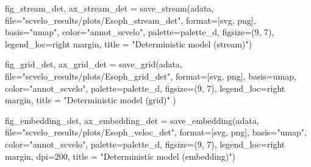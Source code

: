 \documentclass[
  letterpaper,
  DIV=11,
  numbers=noendperiod]{scrreprt}
\newenvironment{Shaded}{\begin{snugshade}}{\end{snugshade}}
\newcommand{\BuiltInTok}[1]{\textcolor[rgb]{0.00,0.23,0.31}{#1}}
\newcommand{\DecValTok}[1]{\textcolor[rgb]{0.68,0.00,0.00}{#1}}
\newcommand{\NormalTok}[1]{\textcolor[rgb]{0.00,0.23,0.31}{#1}}
\newcommand{\OperatorTok}[1]{\textcolor[rgb]{0.37,0.37,0.37}{#1}}
\newcommand{\StringTok}[1]{\textcolor[rgb]{0.13,0.47,0.30}{#1}}
\begin{document}
\begin{Shaded}
\begin{Highlighting}[]
\NormalTok{fig\_stream\_det, ax\_stream\_det }\OperatorTok{=}\NormalTok{ save\_stream(adata, }\BuiltInTok{file}\OperatorTok{=}\StringTok{"scvelo\_results/plots/Esoph\_stream\_det"}\NormalTok{, }\BuiltInTok{format}\OperatorTok{=}\NormalTok{[}\StringTok{\textquotesingle{}svg\textquotesingle{}}\NormalTok{, }\StringTok{\textquotesingle{}png\textquotesingle{}}\NormalTok{], basis}\OperatorTok{=}\StringTok{"umap"}\NormalTok{, color}\OperatorTok{=}\StringTok{"annot\_scvelo"}\NormalTok{, palette}\OperatorTok{=}\NormalTok{palette\_d, figsize}\OperatorTok{=}\NormalTok{(}\DecValTok{9}\NormalTok{, }\DecValTok{7}\NormalTok{), legend\_loc}\OperatorTok{=}\StringTok{\textquotesingle{}right margin\textquotesingle{}}\NormalTok{, title }\OperatorTok{=} \StringTok{"Deterministic model (stream)"}\NormalTok{)}

\NormalTok{fig\_grid\_det, ax\_grid\_det }\OperatorTok{=}\NormalTok{ save\_grid(adata, }\BuiltInTok{file}\OperatorTok{=}\StringTok{"scvelo\_results/plots/Esoph\_grid\_det"}\NormalTok{, }\BuiltInTok{format}\OperatorTok{=}\NormalTok{[}\StringTok{\textquotesingle{}svg\textquotesingle{}}\NormalTok{, }\StringTok{\textquotesingle{}png\textquotesingle{}}\NormalTok{], basis}\OperatorTok{=}\StringTok{\textquotesingle{}umap\textquotesingle{}}\NormalTok{, color}\OperatorTok{=}\StringTok{"annot\_scvelo"}\NormalTok{, palette}\OperatorTok{=}\NormalTok{palette\_d, figsize}\OperatorTok{=}\NormalTok{(}\DecValTok{9}\NormalTok{, }\DecValTok{7}\NormalTok{), legend\_loc}\OperatorTok{=}\StringTok{\textquotesingle{}right margin\textquotesingle{}}\NormalTok{, title }\OperatorTok{=} \StringTok{"Deterministic model (grid)"}\NormalTok{ )}

\NormalTok{fig\_embedding\_det, ax\_embedding\_det }\OperatorTok{=}\NormalTok{ save\_embedding(adata, }\BuiltInTok{file}\OperatorTok{=}\StringTok{"scvelo\_results/plots/Esoph\_veloc\_det"}\NormalTok{, }\BuiltInTok{format}\OperatorTok{=}\NormalTok{[}\StringTok{\textquotesingle{}svg\textquotesingle{}}\NormalTok{, }\StringTok{\textquotesingle{}png\textquotesingle{}}\NormalTok{], basis}\OperatorTok{=}\StringTok{"umap"}\NormalTok{, color}\OperatorTok{=}\StringTok{"annot\_scvelo"}\NormalTok{, palette}\OperatorTok{=}\NormalTok{palette\_d, figsize}\OperatorTok{=}\NormalTok{(}\DecValTok{9}\NormalTok{, }\DecValTok{7}\NormalTok{), legend\_loc}\OperatorTok{=}\StringTok{\textquotesingle{}right margin\textquotesingle{}}\NormalTok{, dpi}\OperatorTok{=}\DecValTok{200}\NormalTok{, title }\OperatorTok{=} \StringTok{"Deterministic model (embedding)"}\NormalTok{)}
\end{Highlighting}
\end{Shaded}
\end{document}
